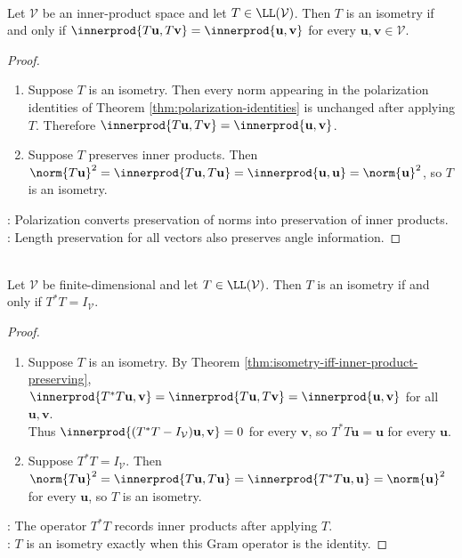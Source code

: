 \begin{theorem} \label{thm:isometry-iff-inner-product-preserving} \\
Let $\mathcal{V}$ be an inner-product space and let $T\in\LL(\mathcal{V})$. Then $T$ is an isometry if and only if $\innerprod{T\mathbf{u},T\mathbf{v}}=\innerprod{\mathbf{u},\mathbf{v}}$ for every $\mathbf{u},\mathbf{v}\in\mathcal{V}$.
\begin{proof}
\begin{enumerate}[label=\roman*.]
\setlength{\itemsep}{0pt}
\item[$(\Rightarrow)$] Suppose $T$ is an isometry. Then every norm appearing in the polarization identities of Theorem \ref{thm:polarization-identities} is unchanged after applying $T$. Therefore $\innerprod{T\mathbf{u},T\mathbf{v}}=\innerprod{\mathbf{u},\mathbf{v}}$.
\item[$(\Leftarrow)$] Suppose $T$ preserves inner products. Then $\norm{T\mathbf{u}}^2=\innerprod{T\mathbf{u},T\mathbf{u}}=\innerprod{\mathbf{u},\mathbf{u}}=\norm{\mathbf{u}}^2$, so $T$ is an isometry.
\end{enumerate}
: Polarization converts preservation of norms into preservation of inner products.\\
: Length preservation for all vectors also preserves angle information.
\end{proof}
\end{theorem}

\begin{theorem} \label{thm:finite-dimensional-isometry-iff-adjoint-product-identity} \\
Let $\mathcal{V}$ be finite-dimensional and let $T\in\LL(\mathcal{V})$. Then $T$ is an isometry if and only if $T^*T=I_{\mathcal{V}}$.
\begin{proof}
\begin{enumerate}[label=\roman*.]
\setlength{\itemsep}{0pt}
\item[$(\Rightarrow)$] Suppose $T$ is an isometry. By Theorem \ref{thm:isometry-iff-inner-product-preserving}, $\innerprod{T^*T\mathbf{u},\mathbf{v}}=\innerprod{T\mathbf{u},T\mathbf{v}}=\innerprod{\mathbf{u},\mathbf{v}}$ for all $\mathbf{u},\mathbf{v}$.\\
Thus $\innerprod{(T^*T-I_{\mathcal{V}})\mathbf{u},\mathbf{v}}=0$ for every $\mathbf{v}$, so $T^*T\mathbf{u}=\mathbf{u}$ for every $\mathbf{u}$.
\item[$(\Leftarrow)$] Suppose $T^*T=I_{\mathcal{V}}$. Then $\norm{T\mathbf{u}}^2 =\innerprod{T\mathbf{u},T\mathbf{u}} =\innerprod{T^*T\mathbf{u},\mathbf{u}} =\norm{\mathbf{u}}^2$ for every $\mathbf{u}$, so $T$ is an isometry.
\end{enumerate}
: The operator $T^*T$ records inner products after applying $T$.\\
: $T$ is an isometry exactly when this Gram operator is the identity.
\end{proof}
\end{theorem}

